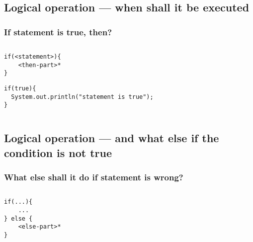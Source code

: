 \documentclass[en, 11pt, xcolor=dvipsnames]{beamer}
\begin{document}
\subsection{Logical operation --- when shall it be executed}
\begin{frame}[fragile]
	\frametitle{If statement is true, then?}


	\begin{columns}[c]
		\begin{column}{0.9\textwidth}

			\begin{lstlisting}[style=Java]
if(<statement>){
    <then-part>*
}\end{lstlisting}

			\begin{lstlisting}[style=Java]
if(true){
  System.out.println("statement is true");
}\end{lstlisting}

		\end{column}
	\end{columns}

\end{frame}

\subsection{Logical operation --- and what else if the condition is not true}
\begin{frame}[fragile]
	\frametitle{What else shall it do if statement is wrong?}


	\begin{columns}[c]
		\begin{column}{0.9\textwidth}

			\begin{lstlisting}[style=Java]
if(...){
    ...
} else {
    <else-part>*
}\end{lstlisting}

		\end{column}
	\end{columns}

\end{frame}
\end{document}
